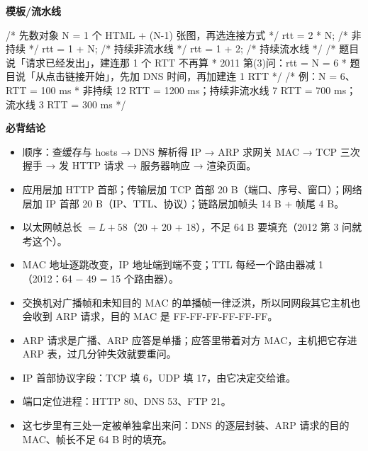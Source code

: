 \documentclass[10pt,a4paper]{ctexart}
\begin{document}
\textbf{模板/流水线}

\begin{codebox}
/* 先数对象 N = 1 个 HTML + (N-1) 张图，再选连接方式 */
rtt = 2 * N;                 /* 非持续 */
rtt = 1 + N;                 /* 持续非流水线 */
rtt = 1 + 2;                 /* 持续流水线 */
/* 题目说「请求已经发出」，建连那 1 个 RTT 不再算
 * 2011 第(3)问：rtt = N = 6
 * 题目说「从点击链接开始」，先加 DNS 时间，再加建连 1 RTT
 */
/* 例：N = 6、RTT = 100 ms
 * 非持续 12 RTT = 1200 ms；持续非流水线 7 RTT = 700 ms；流水线 3 RTT = 300 ms
 */
\end{codebox}




\textbf{必背结论}

\begin{itemize}

\item 顺序：查缓存与 hosts → DNS 解析得 IP → ARP 求网关 MAC → TCP 三次握手 → 发 HTTP 请求 → 服务器响应 → 渲染页面。

\item 应用层加 HTTP 首部；传输层加 TCP 首部 20 B（端口、序号、窗口）；网络层加 IP 首部 20 B（IP、TTL、协议）；链路层加帧头 14 B + 帧尾 4 B。

\item 以太网帧总长 $=L+58$（20 + 20 + 18），不足 64 B 要填充（2012 第 3 问就考这个）。

\item MAC 地址逐跳改变，IP 地址端到端不变；TTL 每经一个路由器减 1（2012：64 − 49 = 15 个路由器）。

\item 交换机对广播帧和未知目的 MAC 的单播帧一律泛洪，所以同网段其它主机也会收到 ARP 请求，目的 MAC 是 FF-FF-FF-FF-FF-FF。

\item ARP 请求是广播、ARP 应答是单播；应答里带着对方 MAC，主机把它存进 ARP 表，过几分钟失效就要重问。

\item IP 首部协议字段：TCP 填 6，UDP 填 17，由它决定交给谁。

\item 端口定位进程：HTTP 80、DNS 53、FTP 21。

\item 这七步里有三处一定被单独拿出来问：DNS 的逐层封装、ARP 请求的目的 MAC、帧长不足 64 B 时的填充。

\end{itemize}
\end{document}
